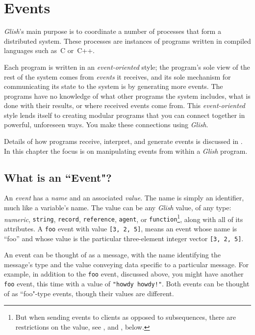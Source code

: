 
\chapter{Events}
\label{events}

{\em Glish}'s main purpose is to coordinate a number of processes that
form a distributed system.  These processes are instances of programs
written in compiled languages such as~C or~C++.

Each program is written in an {\em event-oriented} style; the program's
sole view of the rest of the system comes from {\em events} it receives,
and its sole mechanism for communicating its state to
the system is by generating more events.  The programs have no
knowledge of what other programs the system includes, what is done
with their results, or where received events come from.  This {\em
event-oriented} style lends itself to creating modular programs that
you can connect together in powerful, unforeseen ways.  You make
these connections using {\em Glish}.

Details of how programs receive, interpret, and
generate events is discussed in .  In this chapter the
focus is on manipulating events from within a {\em Glish} program.

\section{What is an ``Event"?}
\label{event-defs}

An {\em event} has a {\em name} and an associated {\em value\/}.  The
name is simply an identifier, much like a variable's name.  The value
can be any {\em Glish} value, of any type: {\em numeric\/}, {\tt string},
{\tt record}, {\tt reference}, {\tt agent}, or
{\tt function}\footnote{But when sending events to clients as opposed
to subsequences, there are restrictions on the value,  see
, and , below.}, along
with all of its attributes. A {\tt foo} event with
value {\tt [3, 2, 5]}, means an event whose name is ``foo'' and whose value
is the particular three-element integer vector {\tt [3, 2, 5]}.

An event can be thought of as a message, with the name identifying
the message's type and the value conveying data specific to a
particular message.  For example, in addition to the {\tt foo} event,
discussed above, you might have another {\tt foo} event, this
time with a value of {\tt "howdy howdy!"}.  Both events can be
thought of as ``foo"-type events, though their values are different.

